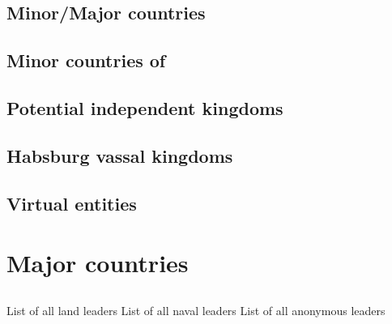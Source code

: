 



\section{Minor/Major countries}





\section{Minor countries of \ROTW}





\section{Potential independent kingdoms}





\section{Habsburg vassal kingdoms}\label{ch10:Habsburg vassal kingdoms}





\section{Virtual entities}


\chapter{Major countries}




\section{\paysmajeurAngleterre}

\aparag List of all land leaders 
\aparag List of all naval leaders 
\aparag List of all anonymous leaders \listanonymeangleterre




